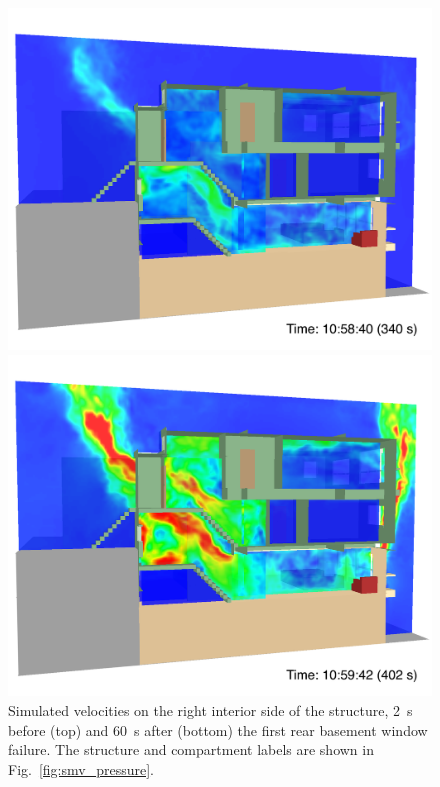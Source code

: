 \documentclass[12pt,oneside]{book}
\begin{document}
\begin{figure}[!ht]
\includegraphics[width=4.5in]{../Figures/SMV_Vel_340_s}


\includegraphics[width=4.5in]{../Figures/SMV_Vel_402_s}


\caption[Simulated velocities on the right interior side of the structure.]
{Simulated velocities on the right interior side of the structure, 2~s before (top) and 60~s after (bottom) the first rear basement window failure. The structure and compartment labels are shown in Fig.~\ref{fig:smv_pressure}.}
\label{fig:smv_velocity}
\end{figure}


\clearpage
\end{document}
